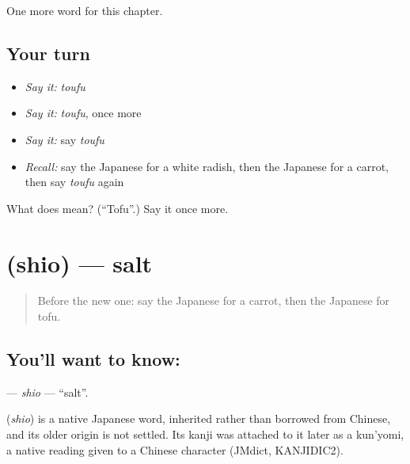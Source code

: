 \begin{grammarlens}[title={What you've built}]
One more word for this chapter.
\end{grammarlens}

\subsection*{Your turn}
\begin{itemize}
\raggedright
  \item \emph{Say it:} \emph{toufu}
  \item \emph{Say it:} \emph{toufu}, once more
  \item \emph{Say it:} say \emph{toufu}
  \item \emph{Recall:} say the Japanese for a white radish, then the Japanese for a carrot, then say \emph{toufu} again
\end{itemize}

\begin{tcolorbox}[breakable,colback=teal!4,colframe=teal!35!black,title={Before you move on}]
What does  mean? (\textquotedblleft{}Tofu\textquotedblright{}.) Say it once more.
\end{tcolorbox}
\section[\texorpdfstring{\ja{しお} (shio)}{しお (shio)}]{ (shio) — salt}

\label{lesson:JA-C34-shio}



\begin{quote}
Before the new one: say the Japanese for a carrot, then the Japanese for tofu.
\end{quote}

\subsection*{You'll want to know: }
\textbf{} — \emph{shio} — \textquotedblleft{}salt\textquotedblright{}.

\begin{cousinweb}
\textbf{} (\emph{shio}) is a native Japanese word, inherited rather than borrowed from Chinese, and its older origin is not settled. Its kanji was attached to it later as a kun'yomi, a native reading given to a Chinese character (JMdict, KANJIDIC2).
\end{cousinweb}

